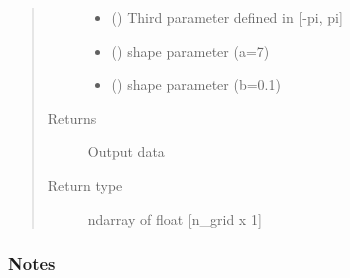 \documentclass[letterpaper,10pt,english,openany,oneside]{sphinxmanual}
\begin{document}
\begin{fulllineitems}
\begin{quote}
\begin{description}
\begin{itemize}
\item {} 
\sphinxstyleliteralstrong{\sphinxupquote{{[}}}\sphinxstyleliteralstrong{\sphinxupquote{{]}}} (\sphinxstyleliteralemphasis{\sphinxupquote{ {[}}}\sphinxstyleliteralemphasis{\sphinxupquote{{]}}}) \textendash{} Third parameter defined in {[}-pi, pi{]}

\item {} 
\sphinxstyleliteralstrong{\sphinxupquote{{[}}}\sphinxstyleliteralstrong{\sphinxupquote{{]}}} () \textendash{} shape parameter (a=7)

\item {} 
\sphinxstyleliteralstrong{\sphinxupquote{{[}}}\sphinxstyleliteralstrong{\sphinxupquote{{]}}} () \textendash{} shape parameter (b=0.1)

\end{itemize}

\item[{Returns}] \leavevmode
{} \textendash{} Output data

\item[{Return type}] \leavevmode
ndarray of float {[}n\_grid x 1{]}

\end{description}\end{quote}
\subsubsection*{Notes}

\begin{figure}[htbp]
\centering

\noindent{}
\end{figure}


\end{fulllineitems}
\end{document}
